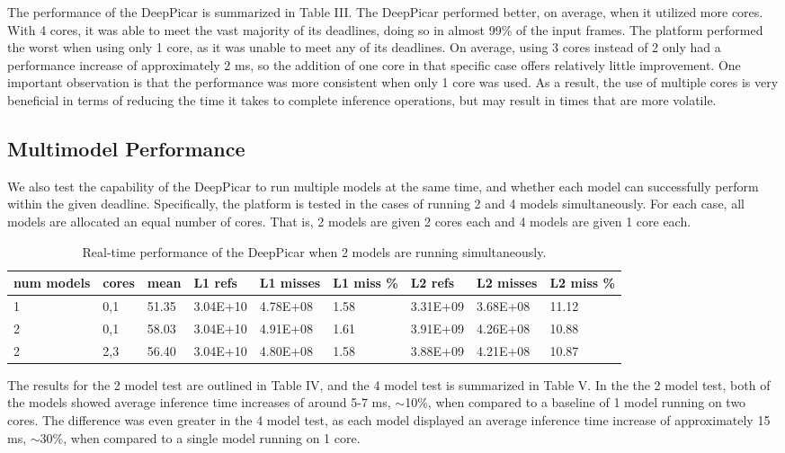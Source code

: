 The performance of the DeepPicar is summarized in Table III. The DeepPicar performed better, on average, 
when it utilized more cores. With 4 cores, it was able to meet the vast majority of its deadlines, doing 
so in almost 99\% of the input frames. The platform performed the worst when using only 1 core, 
as it was unable to meet any of its deadlines.  On average, using 3 cores instead of 2 only had a 
performance increase of approximately 2 ms, so the addition of one core in that specific case offers 
relatively little improvement. One important observation is that the performance was more consistent 
when only 1 core was used. As a result, the use of multiple cores is very beneficial in terms of 
reducing the time it takes to complete inference operations, but may result in times that are more 
volatile.

\subsection{Multimodel Performance}
We also test the capability of the DeepPicar to run multiple models at the same time, and whether each 
model can successfully perform within the given deadline. Specifically, the platform is tested in the 
cases of running 2 and 4 models simultaneously. For each case, all models are allocated an equal number 
of cores. That is, 2 models are given 2 cores each and 4 models are given 1 core each.

\begin{table}
  \centering
  \begin{tabular} {| l | l | l | l | l | l | l | l | l |}
  \hline
  \textbf{num models} & \textbf{cores} & \textbf{mean} & \textbf{L1 refs} & \textbf{L1 
    misses} & \textbf{L1 miss \%} & \textbf{L2 refs} & \textbf{L2 misses} & \textbf{L2 miss \%} \\ \hline
  1 & 0,1 & 51.35 & 3.04E+10 & 4.78E+08 & 1.58 & 3.31E+09 & 3.68E+08 & 11.12\\ \hline
  2 & 0,1 & 58.03 & 3.04E+10 & 4.91E+08 & 1.61 & 3.91E+09 & 4.26E+08 & 10.88 \\ \hline
  2 & 2,3 & 56.40 & 3.04E+10 & 4.80E+08 & 1.58 & 3.88E+09 & 4.21E+08 & 10.87 \\ \hline
  \end{tabular}
  \caption{Real-time performance of the DeepPicar when 2 models are running simultaneously.}
\end{table}

The results for the 2 model test are outlined in Table IV, and the 4 model test is summarized in Table 
V. In the the 2 model test, both of the models showed average inference time increases of around 5-7 
ms, $\sim$10\%, when compared to a baseline of 1 model running on two cores. The difference was even 
greater in the 4 model test, as each model displayed an average inference time increase of 
approximately 15 ms, $\sim$30\%, when compared to a single model running on 1 core.

